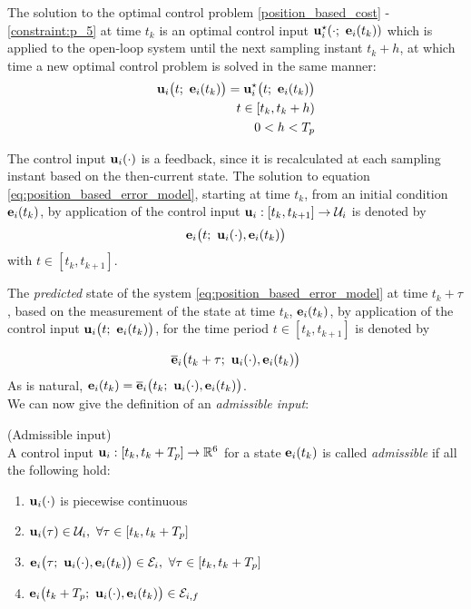 The solution to the optimal control problem \eqref{position_based_cost} -
\eqref{constraint:p_5} at time $t_k$ is an optimal control input
$\bm{\mathbf{u}}_i^{\star}(\cdot;\ \bm{\mathbf{e}}_i(t_k))$ which
is applied to the open-loop system until the next sampling instant $t_k + h$,
at which time a new optimal control problem is solved in the same manner:
\begin{align}
  \vect{u}_i\big(t;\ \vect{e}_i(t_k)\big) = \vect{u}_i^{\star}\big(t;\ \vect{e}_i(t_k)\big) \label{eq:position_based_optimal_u} \\
  t \in [t_k, t_k + h) \nonumber \\
  0 < h < T_p \nonumber
\end{align}

The control input $\bm{\mathbf{u}}_i(\cdot)$ is a feedback, since it is
recalculated at each sampling instant based on the then-current state. The
solution to equation \eqref{eq:position_based_error_model}, starting at time
$t_k$, from an initial condition $\bm{\mathbf{e}}_i(t_k)$, by application of the
control input $\bm{\mathbf{u}}_i : [t_k, t_{k+1}] \to \mathcal{U}_i$ is denoted by
$$\bm{\mathbf{e}}_i\big(t;\ \bm{\mathbf{u}}_i(\cdot), \bm{\mathbf{e}}_i(t_k)\big)$$
with $t \in [t_k, t_{k+1}]$.

The \textit{predicted} state of the system \eqref{eq:position_based_error_model}
at time $t_k + \tau$, based on the measurement of the state at time
$t_k$, $\bm{\mathbf{e}}_i(t_k)$, by application of the control input
$\vect{u}_i\big(t;\ \vect{e}_i(t_k)\big)$, for the time period $t \in [t_k, t_{k+1}]$
is denoted by

\begin{align}
  \overline{\bm{\mathbf{e}}}_i\big(t_k + \tau;\ \bm{\mathbf{u}}_i(\cdot), \bm{\mathbf{e}}_i(t_k)\big) \label{eq:position_based_predicted_error_0}
\end{align}
As is natural,
$\vect{e}_i(t_k) = \overline{\vect{e}}_i\big(t_k;\ \vect{u}_i(\cdot), \vect{e}_i(t_k)\big)$.\\

We can now give the definition of an \textit{admissible input}:

\begin{bw_box}
\begin{definition} (Admissible input)\\

  A control input $\bm{\mathbf{u}}_i : [t_k, t_k + T_p] \to \mathbb{R}^6$ for a state
  $\bm{\mathbf{e}}_i(t_k)$ is called \textit{admissible} if all the following hold:

  \begin{enumerate}
    \item $\bm{\mathbf{u}}_i(\cdot)$ is piecewise continuous
    \item $\vect{u}_i(\tau) \in \mathcal{U}_i,\ \forall \tau \in [t_k, t_k + T_p]$
    \item $\vect{e}_i\big(\tau;\ \vect{u}_i(\cdot), \vect{e}_i(t_k)\big) \in \mathcal{E}_i,\ \forall \tau \in [t_k, t_k + T_p]$
    \item $\vect{e}_i\big(t_k + T_p;\ \vect{u}_i(\cdot), \vect{e}_i(t_k)\big) \in \mathcal{E}_{i,f}$
  \end{enumerate}

\end{definition}
\end{bw_box}

